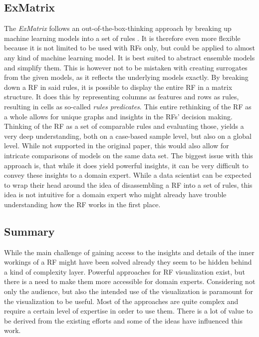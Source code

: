 \documentclass[a4paper, 12pt]{article}
\begin{document}
\subsection{ExMatrix}
The \textit{ExMatrix} follows an out-of-the-box-thinking approach by breaking up machine
learning models into a set of rules \cite{neto2020explainable} \cite{ming2018rulematrix}.
It is therefore even more flexible because it is not limited
to be used with RFs only, but could be applied to almost any kind of machine learning model.
It is best suited to abstract ensemble models and simplify them. This is however not to be
mistaken with creating surrogates from the given models, as it reflects the underlying
models exactly. By breaking down a RF in said rules, it is possible to display the entire
RF in a matrix structure. It does this by representing columns as features and rows as rules, resulting in
cells as so-called \textit{rules predicates}. This entire rethinking of the RF as a whole allows for
unique graphs and insights in the RFs' decision making. Thinking of the RF as a set of
comparable rules and evaluating those, yields a very deep understanding, both on a
case-based sample level, but also on a global level. While not supported in the original
paper, this would also allow for intricate comparisons of models on the same data set.
The biggest issue with this approach is, that while it does yield powerful insights, it can
be very difficult to convey these insights to a domain expert. While a data scientist can be
expected to wrap their head around the idea of disassembling a RF into a set of rules, this
idea is not intuitive for a domain expert who might already have trouble understanding how
the RF works in the first place.

\subsection{Summary}
While the main challenge of gaining access to the insights and details of the inner workings
of a RF might have been solved already they seem to be hidden behind a kind of complexity
layer. Powerful approaches for RF visualization exist, but there is a need to make them more
accessible for domain experts. Considering not only the audience, but also the intended
use of the visualization is paramount for the visualization to be useful. Most of the
approaches are quite complex and require a certain level of expertise in order to use them.
There is a lot of value to be derived from the existing efforts and some of the ideas have
influenced this work.
\end{document}
